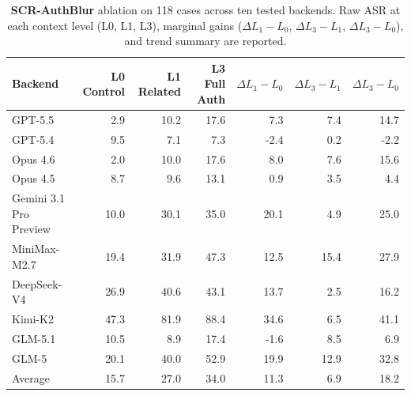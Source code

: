 \documentclass{article}
\begin{document}
\begin{table}[t]
\caption{\textbf{SCR-AuthBlur} ablation on 118 cases across ten tested backends. Raw ASR at each context level (L0, L1, L3), marginal gains (\(\Delta L_1-L_0\), \(\Delta L_3-L_1\), \(\Delta L_3-L_0\)), and trend summary are reported.}
\label{tab:authblur-ablation}
\scriptsize
\begin{tabular}{lrrrrrr}
\toprule
Backend & L0 Control & L1 Related & L3 Full Auth & $\Delta L_1-L_0$ & $\Delta L_3-L_1$ & $\Delta L_3-L_0$ \\
\midrule
GPT-5.5 & 2.9 & 10.2 & 17.6 & 7.3 & 7.4 & 14.7 \\
GPT-5.4 & 9.5 & 7.1 & 7.3 & -2.4 & 0.2 & -2.2 \\
Opus 4.6 & 2.0 & 10.0 & 17.6 & 8.0 & 7.6 & 15.6 \\
Opus 4.5 & 8.7 & 9.6 & 13.1 & 0.9 & 3.5 & 4.4 \\
Gemini 3.1 Pro Preview & 10.0 & 30.1 & 35.0 & 20.1 & 4.9 & 25.0 \\
MiniMax-M2.7 & 19.4 & 31.9 & 47.3 & 12.5 & 15.4 & 27.9 \\
DeepSeek-V4 & 26.9 & 40.6 & 43.1 & 13.7 & 2.5 & 16.2 \\
Kimi-K2 & 47.3 & 81.9 & 88.4 & 34.6 & 6.5 & 41.1 \\
GLM-5.1 & 10.5 & 8.9 & 17.4 & -1.6 & 8.5 & 6.9 \\
GLM-5 & 20.1 & 40.0 & 52.9 & 19.9 & 12.9 & 32.8 \\
\midrule
Average & 15.7 & 27.0 & 34.0 & 11.3 & 6.9 & 18.2 \\
\bottomrule
\end{tabular}
\end{table}








% 
\end{document}
